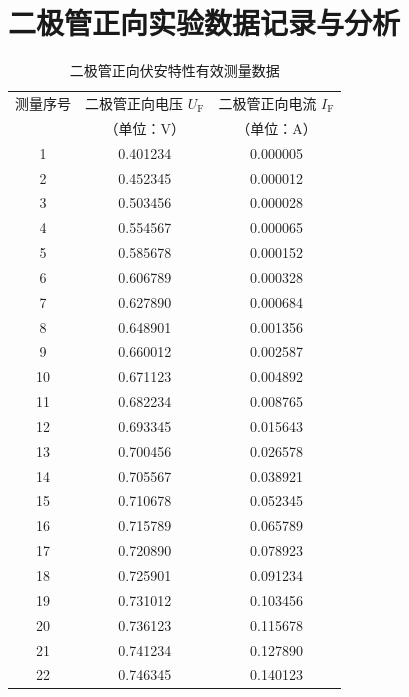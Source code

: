 \documentclass[11pt]{article}
\begin{document}
\section{二极管正向实验数据记录与分析}

\begin{table}[htbp]
  \centering
  \caption{二极管正向伏安特性有效测量数据}
  \label{tab:diode_forward_voltamp}  %
  \begin{threeparttable}
    \begin{tabular}{c c c}
      \toprule
      测量序号 & 二极管正向电压 $U_{\text{F}}$ & 二极管正向电流 $I_{\text{F}}$ \\
      & （单位：$\text{V}$） & （单位：$\text{A}$） \\
      \midrule
      1  & 0.401234 & 0.000005 \\
      2  & 0.452345 & 0.000012 \\
      3  & 0.503456 & 0.000028 \\
      4  & 0.554567 & 0.000065 \\
      5  & 0.585678 & 0.000152 \\
      6  & 0.606789 & 0.000328 \\
      7  & 0.627890 & 0.000684 \\
      8  & 0.648901 & 0.001356 \\
      9  & 0.660012 & 0.002587 \\
      10 & 0.671123 & 0.004892 \\
      11 & 0.682234 & 0.008765 \\
      12 & 0.693345 & 0.015643 \\
      13 & 0.700456 & 0.026578 \\
      14 & 0.705567 & 0.038921 \\
      15 & 0.710678 & 0.052345 \\
      16 & 0.715789 & 0.065789 \\
      17 & 0.720890 & 0.078923 \\
      18 & 0.725901 & 0.091234 \\
      19 & 0.731012 & 0.103456 \\
      20 & 0.736123 & 0.115678 \\
      21 & 0.741234 & 0.127890 \\
      22 & 0.746345 & 0.140123 \\
      \bottomrule
    \end{tabular}
    

\end{threeparttable}
\end{table}
\end{document}
